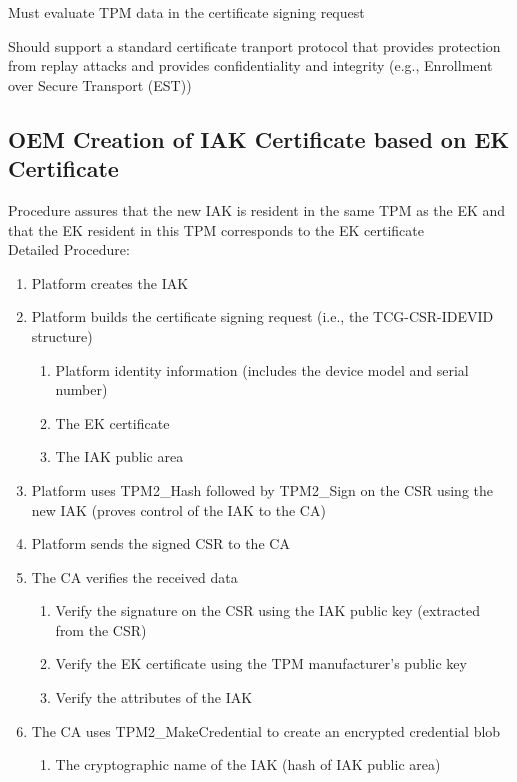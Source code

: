 \documentclass{article}
\begin{document}
Must evaluate TPM data in the certificate signing request

Should support a standard certificate tranport protocol that provides protection from replay attacks and provides confidentiality and integrity (e.g., Enrollment over Secure Transport (EST))


\subsection*{OEM Creation of IAK Certificate based on EK Certificate}

Procedure assures that the new IAK is resident in the same TPM as the EK and that the EK resident in this TPM corresponds to the EK certificate  \\

Detailed Procedure:
\begin{enumerate}
    \item Platform creates the IAK
    \item Platform builds the certificate signing request (i.e., the TCG-CSR-IDEVID structure)
    \begin{enumerate}
        \item Platform identity information (includes the device model and serial number)
        \item The EK certificate
        \item The IAK public area
    \end{enumerate}
    \item Platform uses TPM2\_Hash followed by TPM2\_Sign on the CSR using the new IAK (proves control of the IAK to the CA)
    \item Platform sends the signed CSR to the CA
    \item The CA verifies the received data
    \begin{enumerate}
        \item Verify the signature on the CSR using the IAK public key (extracted from the CSR)
        \item Verify the EK certificate using the TPM manufacturer's public key
        \item Verify the attributes of the IAK
    \end{enumerate}
    \item The CA uses TPM2\_MakeCredential to create an encrypted credential blob 
    \begin{enumerate}
        \item The cryptographic name of the IAK (hash of IAK public area)

\end{enumerate}
\end{enumerate}
\end{document}
